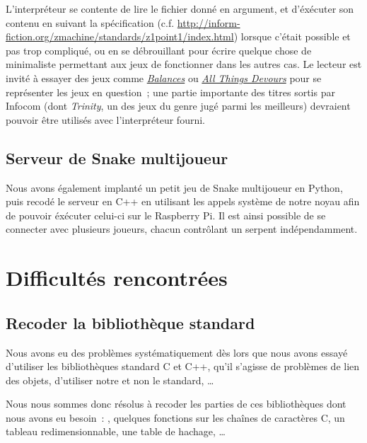 \documentclass[11pt,a4paper]{article}
\begin{document}
L'interpréteur se contente de lire le fichier donné en argument, et
d'éxécuter son contenu en suivant la spécification
(c.f. \href{http://inform-fiction.org/zmachine/standards/z1point1/index.html}
{http://inform-fiction.org/zmachine/standards/z1point1/index.html})
lorsque c'était possible et pas trop compliqué, ou en se débrouillant
pour écrire quelque chose de minimaliste permettant aux jeux de
fonctionner dans les autres cas. Le lecteur est invité à essayer des
jeux comme
\href{http://ifdb.tads.org/viewgame?id=x6ne0bbd2oqm6h3a}{\textit{Balances}} ou
\href{http://ifdb.tads.org/viewgame?id=5e23lnq25gon9tp3}{\textit{All
    Things Devours}} pour se représenter les jeux en question~; une
partie importante des titres sortis par Infocom (dont \textit{Trinity}, un des
jeux du genre jugé parmi les meilleurs) devraient pouvoir être utilisés
avec l'interpréteur fourni.

\subsection{Serveur de Snake multijoueur}
Nous avons également implanté un petit jeu de Snake multijoueur en
Python, puis recodé le serveur en C++ en utilisant les appels système
de notre noyau afin de pouvoir éxécuter celui-ci sur le Raspberry
Pi. Il est ainsi possible de se connecter avec plusieurs joueurs,
chacun contrôlant un serpent indépendamment.

\section{Difficultés rencontrées}


\subsection*{Recoder la bibliothèque standard}
Nous avons eu des problèmes systématiquement dès lors que nous avons essayé
d'utiliser les bibliothèques standard C et C++, qu'il s'agisse de problèmes de
lien des objets, d'utiliser notre  et non le 
standard, \ldots

Nous nous sommes donc résolus à recoder les parties de ces bibliothèques dont
nous avons eu besoin~: , quelques fonctions sur les chaînes de
caractères C, un tableau redimensionnable, une table de hachage, \ldots
\end{document}
